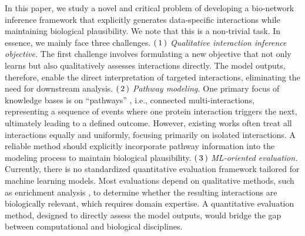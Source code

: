 In this paper, we study a novel and critical problem of developing a bio-network inference framework that explicitly generates data-specific interactions while maintaining biological plausibility.
We note that this is a non-trivial task. 
In essence, we mainly face three challenges. 
$\rm(\hspace{.18em}1\hspace{.18em})$ 
\textit{Qualitative interaction inference objective.}
The first challenge involves formulating a new objective that not only learns but also qualitatively assesses interactions directly.
The model outputs, therefore, enable the direct interpretation of targeted interactions, eliminating the need for downstream analysis.
$\rm(\hspace{.18em}2\hspace{.18em})$ 
\textit{Pathway modeling.}
One primary focus of knowledge bases is on ``pathways'' \cite{KEGG2024}, i.e., connected multi-interactions, representing a sequence of events where one protein interaction triggers the next, ultimately leading to a defined outcome.
However, existing works often treat all interactions equally and uniformly, focusing primarily on isolated interactions.
A reliable method should explicitly incorporate pathway information into the modeling process to maintain biological plausibility.
$\rm(\hspace{.18em}3\hspace{.18em})$ 
\textit{ML-oriented evaluation.}
Currently, there is no standardized quantitative evaluation framework tailored for machine learning models.
Most evaluations depend on qualitative methods, such as enrichment analysis \cite{enrichment}, to determine whether the resulting interactions are biologically relevant, which requires domain expertise.
A quantitative evaluation method, designed to directly assess the model outputs, would bridge the gap between computational and biological disciplines.

